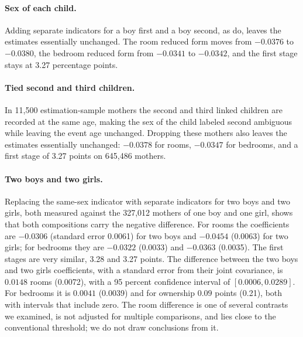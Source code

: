 \paragraph{Sex of each child.}
Adding separate indicators for a boy first and a boy second, as
\citet{angrist1998children} do, leaves the estimates essentially unchanged. The room
reduced form moves from $-0.0376$ to $-0.0380$, the bedroom reduced form from
$-0.0341$ to $-0.0342$, and the first stage stays at 3.27 percentage points.

\paragraph{Tied second and third children.}
In 11,500 estimation-sample mothers the second and third linked children are
recorded at the same age, making the sex of the child labeled second ambiguous
while leaving the event age unchanged. Dropping these mothers also leaves the
estimates essentially unchanged: $-0.0378$ for rooms, $-0.0347$ for bedrooms, and a
first stage of 3.27 points on 645,486 mothers.

\paragraph{Two boys and two girls.}
Replacing the same-sex indicator with separate indicators for two boys and two
girls, both measured against the 327,012 mothers of one boy and one girl, shows
that both compositions carry the negative difference. For rooms the coefficients
are $-0.0306$ (standard error 0.0061) for two boys and $-0.0454$ (0.0063) for two
girls; for bedrooms they are $-0.0322$ (0.0033) and $-0.0363$ (0.0035). The first
stages are very similar, 3.28 and 3.27 points. The difference between the two boys
and two girls coefficients, with a standard error from their joint covariance, is
$0.0148$ rooms (0.0072), with a 95 percent confidence interval of $[0.0006,0.0289]$.
For bedrooms it is $0.0041$ (0.0039) and for ownership $0.09$ points (0.21), both
with intervals that include zero. The room difference is one of several contrasts
we examined, is not adjusted for multiple comparisons, and lies close to the
conventional threshold; we do not draw conclusions from it.

